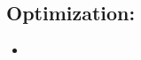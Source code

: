 \documentclass[16pt]{article}
\begin{document}
	\subsection{Optimization:}
	\begin{itemize}
		\item 
	\end{itemize}
	
\end{document}
